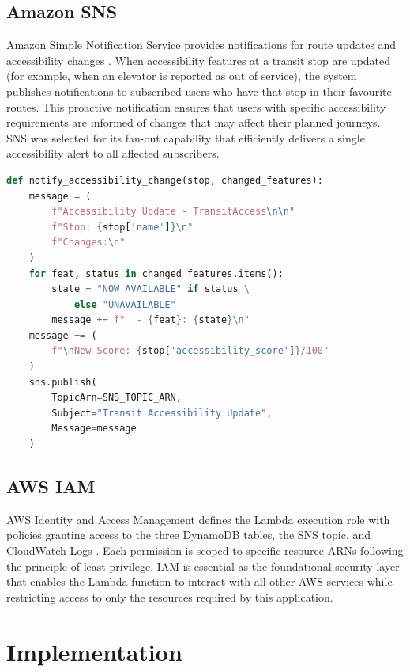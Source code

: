 \documentclass[conference]{IEEEtran}
\begin{document}
\subsection{Amazon SNS}

Amazon Simple Notification Service provides notifications for route updates and accessibility changes \cite{awssns}. When accessibility features at a transit stop are updated (for example, when an elevator is reported as out of service), the system publishes notifications to subscribed users who have that stop in their favourite routes. This proactive notification ensures that users with specific accessibility requirements are informed of changes that may affect their planned journeys. SNS was selected for its fan-out capability that efficiently delivers a single accessibility alert to all affected subscribers.

\begin{lstlisting}[language=Python, caption={SNS notification for accessibility change}]
def notify_accessibility_change(stop, changed_features):
    message = (
        f"Accessibility Update - TransitAccess\n\n"
        f"Stop: {stop['name']}\n"
        f"Changes:\n"
    )
    for feat, status in changed_features.items():
        state = "NOW AVAILABLE" if status \
            else "UNAVAILABLE"
        message += f"  - {feat}: {state}\n"
    message += (
        f"\nNew Score: {stop['accessibility_score']}/100"
    )
    sns.publish(
        TopicArn=SNS_TOPIC_ARN,
        Subject="Transit Accessibility Update",
        Message=message
    )
\end{lstlisting}

\subsection{AWS IAM}

AWS Identity and Access Management defines the Lambda execution role with policies granting access to the three DynamoDB tables, the SNS topic, and CloudWatch Logs \cite{awsiam}. Each permission is scoped to specific resource ARNs following the principle of least privilege. IAM is essential as the foundational security layer that enables the Lambda function to interact with all other AWS services while restricting access to only the resources required by this application.

\section{Implementation}
\end{document}
